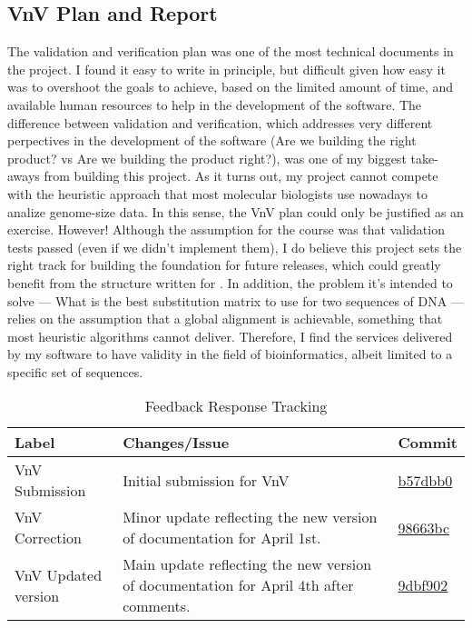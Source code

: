\documentclass{article}
\begin{document}
\subsection{VnV Plan and Report}
The validation and verification plan was one of the most technical documents in the project. 
I found it easy to write in principle, but difficult given how easy it was to overshoot the goals to achieve, based on the 
limited amount of time, and available human resources to help in the development of the software. 
The difference between validation and verification, which addresses very different 
perpectives in the development of the software (Are we building the right product? vs Are we building the product right?), was 
one of my biggest take-aways from building this project. As it turns out, my project cannot compete 
with the heuristic approach that most molecular biologists use nowadays to analize genome-size data. 
In this sense, the VnV plan could only be justified as an exercise. However! Although the assumption for the 
course was that validation tests passed (even if we didn't implement them), I do believe this project sets 
the right track for building the foundation for future releases, which could greatly benefit from the 
structure written for \progname{}.
In addition, the problem it's intended to solve — What is the best substitution matrix to use for two sequences of DNA — relies on the assumption that a global alignment is achievable, 
something that most heuristic algorithms cannot deliver. Therefore, I find the services delivered by my software to have validity in 
the field of bioinformatics, albeit limited to a specific set of sequences.


\begin{table}[h]
    \centering
    \caption{Feedback Response Tracking}
    \label{tab:feedbackVnV}
    \begin{tabularx}{\textwidth}{|>{\raggedright\arraybackslash}p{}|>{\raggedright\arraybackslash}X|>{\raggedright\arraybackslash}p{}|}
        \hline
        \textbf{Label} & \textbf{Changes/Issue} & \textbf{Commit} \\
        \hline\hline
        VnV Submission & Initial submission for VnV & \href{https://github.com/UGarCil/UGarcil_capstone/commit/b57dbb02bdc86099d7e74cf161d3161513e9c361}{b57dbb0} \\
        \hline
        VnV Correction & Minor update reflecting the new version of documentation for April 1st. & \href{https://github.com/UGarCil/UGarcil_capstone/commit/98663bc17f2253d129e7fe6c81e935975f21f1ce}{98663bc} \\
        \hline
        VnV Updated version & Main update reflecting the new version of documentation for April 4th after comments. & \href{https://github.com/UGarCil/UGarcil_capstone/commit/9dbf9028a5dafb9805c4763bf266ce024dfb6c2e}{9dbf902} \\
        \hline
    \end{tabularx}
\end{table}
\newpage
\end{document}
